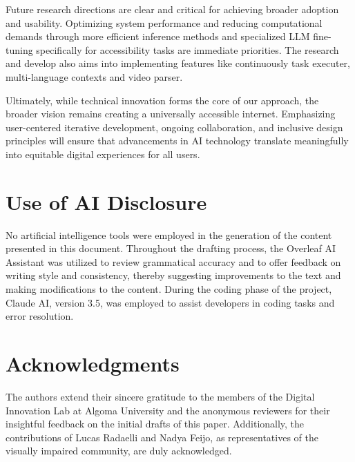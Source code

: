 \documentclass[conference]{IEEEtran}
\begin{document}
Future research directions are clear and critical for achieving broader adoption and usability. Optimizing system performance and reducing computational demands through more efficient inference methods and specialized LLM fine-tuning specifically for accessibility tasks are immediate priorities. The research and develop also aims into implementing features like continuously task executer, multi-language contexts and video parser.

Ultimately, while technical innovation forms the core of our approach, the broader vision remains creating a universally accessible internet. Emphasizing user-centered iterative development, ongoing collaboration, and inclusive design principles will ensure that advancements in AI technology translate meaningfully into equitable digital experiences for all users.


\section*{Use of AI Disclosure}\label{ai-disclosure}
No artificial intelligence tools were employed in the generation of the content presented in this document. Throughout the drafting process, the Overleaf AI Assistant was utilized to review grammatical accuracy and to offer feedback on writing style and consistency, thereby suggesting improvements to the text and making modifications to the content. During the coding phase of the project, Claude AI, version 3.5, was employed to assist developers in coding tasks and error resolution.


\section*{Acknowledgments}\label{ai-disclosure}
The authors extend their sincere gratitude to the members of the Digital Innovation Lab at Algoma University and the anonymous reviewers for their insightful feedback on the initial drafts of this paper. Additionally, the contributions of Lucas Radaelli and Nadya Feijo, as representatives of the visually impaired community, are duly acknowledged.



\end{document}
